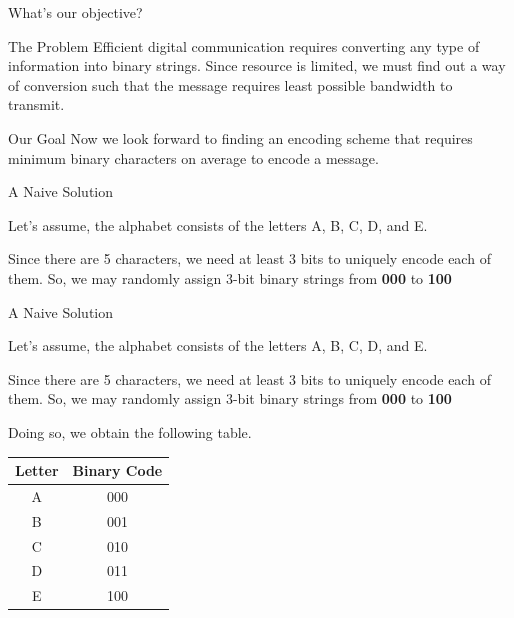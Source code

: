\documentclass{beamer}
\begin{document}
	\begin{frame}{What's our objective?}
		
		\begin{block}{The Problem}
			Efficient digital communication requires converting any type of information into binary strings. Since resource is limited, we must find out a way of conversion such that the message requires least possible bandwidth to transmit.
		\end{block}
		\begin{alertblock}{Our Goal}
			Now we look forward to finding an encoding scheme that requires minimum binary characters on average to encode a message.
		\end{alertblock}
		
	\end{frame}
	
	\begin{frame}{A Naive Solution}
		
		\begin{alertblock}{}
			Let's assume, the alphabet consists of the letters A, B, C, D, and E.
		\end{alertblock}
		
		\begin{block}{}
			Since there are 5 characters, we need at least 3 bits to uniquely encode each of them. So, we may randomly assign 3-bit binary strings from \textbf{000} to \textbf{100}
		\end{block}
		
	\end{frame}
	
	\begin{frame}{A Naive Solution}
		
		\begin{alertblock}{}
			Let's assume, the alphabet consists of the letters A, B, C, D, and E.
		\end{alertblock}
		
		\begin{block}{}
			Since there are 5 characters, we need at least 3 bits to uniquely encode each of them. So, we may randomly assign 3-bit binary strings from \textbf{000} to \textbf{100}
		\end{block}
		
		Doing so, we obtain the following table.
		
		\begin{table}
			\begin{tabular}{c|c}
				\hline
				\onslide<1-> \textbf{Letter} & \textbf{Binary Code} \\
				\hline
				A & 000  \\
				B & 001  \\
				C & 010 \\
				D & 011 \\
				E & 100 
			\end{tabular}
		\end{table}
		
	\end{frame}
	
\end{document}
